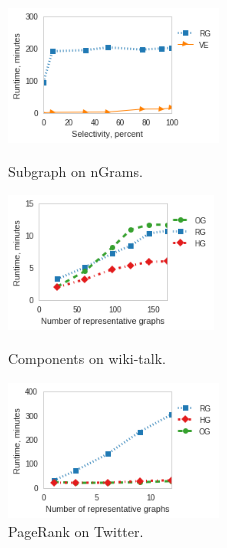 \begin{figure}
\centering
\begin{minipage}{2.2in}
\centering
\includegraphics[width=2.2in]{figs/subgraph_ngrams_build13.png}
\vspace{-0.2in}
\caption{Subgraph on nGrams.}
\label{fig:subgraphngrams}
\vspace{-0.1in}
\end{minipage}
\begin{minipage}{2.15in}
\centering
\includegraphics[width=2.15in]{figs/cc_wikitalk_build13.png}
\vspace{-0.2in}
\caption{Components on wiki-talk.}
\label{fig:ccwiki}
\vspace{-0.1in}
\end{minipage}
\begin{minipage}{2.2in}
\centering
\includegraphics[width=2.2in]{figs/prank_twitter_build13.png}
\vspace{-0.2in}
\caption{PageRank on Twitter.}
\label{fig:pranktwitter}
\vspace{-0.1in}
\end{minipage}
\end{figure}

